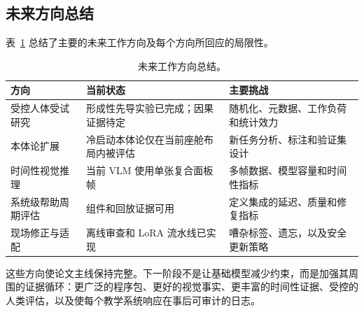\subsection{未来方向总结}

表~\ref{tab:future-work} 总结了主要的未来工作方向及每个方向所回应的局限性。

\begin{table}[htbp]
  \centering
  \caption{未来工作方向总结。}
  \label{tab:future-work}
  \small
  \begin{tabularx}{\textwidth}{@{}>{\raggedright\arraybackslash}p{}>{\raggedright\arraybackslash}X>{\raggedright\arraybackslash}X@{}}
  \toprule
  \textbf{方向} & \textbf{当前状态} & \textbf{主要挑战} \\
  \midrule
  受控人体受试研究 &
    形成性先导实验已完成；因果证据待定 &
    随机化、元数据、工作负荷和统计效力 \\

  本体论扩展 &
    冷启动本体论仅在当前座舱布局内被评估 &
    新任务分析、标注和验证集设计 \\

  时间性视觉推理 &
    当前 VLM 使用单张复合面板帧 &
    多帧数据、模型容量和时间性指标 \\

  系统级帮助周期评估 &
    组件和回放证据可用 &
    定义集成的延迟、质量和修复指标 \\

  现场修正与适配 &
    离线审查和 LoRA 流水线已实现 &
    嘈杂标签、遗忘，以及安全更新策略 \\

  \bottomrule
  \end{tabularx}
\end{table}

这些方向使论文主线保持完整。下一阶段不是让基础模型减少约束，而是加强其周围的证据循环：更广泛的程序包、更好的视觉事实、更丰富的时间性证据、受控的人类评估，以及使每个教学系统响应在事后可审计的日志。
